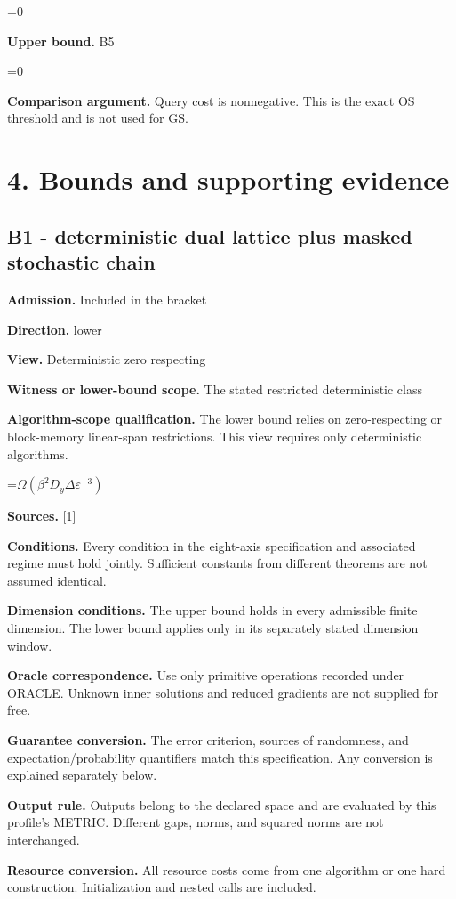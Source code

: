 \documentclass[10pt,a4paper]{article}
\newcommand{\AtlasMath}[1]{\par\begingroup\centering\setbox0=\hbox{$\displaystyle #1$}\ifdim\wd0>1.4\linewidth\typeout{ATLAS WIDE FORMULA: \the\wd0}\fi\ifdim\wd0>\linewidth\resizebox{\linewidth}{!}{\box0}\else\box0\fi\par\endgroup}
\begin{document}
\AtlasMath{0}
\textbf{Upper bound.} B5

\AtlasMath{0}
\textbf{Comparison argument.} Query cost is nonnegative. This is the exact OS threshold and is not used for GS.

\section{4. Bounds and supporting evidence}
\subsection{B1 - deterministic dual lattice plus masked stochastic chain}
\textbf{Admission.} Included in the bracket

\textbf{Direction.} lower

\textbf{View.} Deterministic zero respecting

\textbf{Witness or lower-bound scope.} The stated restricted deterministic class

\textbf{Algorithm-scope qualification.} The lower bound relies on zero-respecting or block-memory linear-span restrictions. This view requires only deterministic algorithms.

\AtlasMath{\Omega(\beta^2D_y\Delta\varepsilon^{-3})}
\textbf{Sources.} \href{https://arxiv.org/pdf/2609.14233v1}{[1]}

\textbf{Conditions.} Every condition in the eight-axis specification and associated regime must hold jointly. Sufficient constants from different theorems are not assumed identical.

\textbf{Dimension conditions.} The upper bound holds in every admissible finite dimension. The lower bound applies only in its separately stated dimension window.

\textbf{Oracle correspondence.} Use only primitive operations recorded under ORACLE. Unknown inner solutions and reduced gradients are not supplied for free.

\textbf{Guarantee conversion.} The error criterion, sources of randomness, and expectation/probability quantifiers match this specification. Any conversion is explained separately below.

\textbf{Output rule.} Outputs belong to the declared space and are evaluated by this profile's METRIC. Different gaps, norms, and squared norms are not interchanged.

\textbf{Resource conversion.} All resource costs come from one algorithm or one hard construction. Initialization and nested calls are included.
\end{document}
